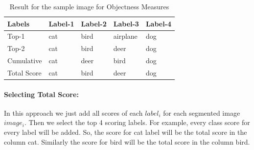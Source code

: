 

\begin{table}
\centering
\caption{Result for the sample image for Objectness Measures}
\label{resobj}
\begin{tabularx}{\linewidth}{|*{5}{X|}}
\hline
Labels      & Label-1 & Label-2 & Label-3 & Label-4 \\ \hline
Top-1       & cat     & bird   & airplane & dog           \\ \hline
Top-2       & cat     & bird   & deer     & dog           \\ \hline
Cumulative  & cat     & deer   & bird     & dog            \\ \hline
Total Score & cat     & bird   & deer     & dog           \\ \hline
\end{tabularx}
\end{table}
\paragraph{Selecting Total Score:}
In this approach we just add all scores of each $label_{i}$ for each segmented image $image_{i}$. Then we select the top 4 scoring labels. For example, every class score for every label will be added. So, the score for cat label will be the total score in the column cat. Similarly the score for bird will be the total score in the column bird.

